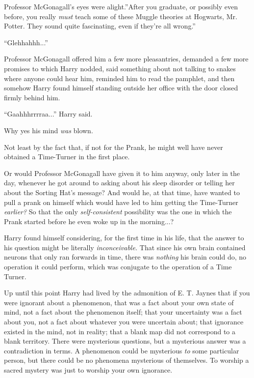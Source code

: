 Professor McGonagall's eyes were alight.''After you graduate, or
possibly even before, you really \emph{must} teach some of these Muggle
theories at Hogwarts, Mr. Potter. They sound quite fascinating, even if
they're all wrong.''

``Glehhahhh...''

Professor McGonagall offered him a few more pleasantries, demanded a few
more promises to which Harry nodded, said something about not talking to
snakes where anyone could hear him, reminded him to read the pamphlet,
and then somehow Harry found himself standing outside her office with
the door closed firmly behind him.

``Gaahhhrrrraa...'' Harry said.

Why yes his mind \emph{was} blown.

Not least by the fact that, if not for the Prank, he might well have
never obtained a Time-Turner in the first place.

Or would Professor McGonagall have given it to him anyway, only later in
the day, whenever he got around to asking about his sleep disorder or
telling her about the Sorting Hat's message? And would he, at that time,
have wanted to pull a prank on himself which would have led to him
getting the Time-Turner \emph{earlier?} So that the only
\emph{self-consistent} possibility was the one in which the Prank
started before he even woke up in the morning...?

Harry found himself considering, for the first time in his life, that
the answer to his question might be literally \emph{inconceivable.} That
since his own brain contained neurons that only ran forwards in time,
there was \emph{nothing} his brain could do, no operation it could
perform, which was conjugate to the operation of a Time Turner.

Up until this point Harry had lived by the admonition of E. T. Jaynes
that if you were ignorant about a phenomenon, that was a fact about your
own state of mind, not a fact about the phenomenon itself; that your
uncertainty was a fact about you, not a fact about whatever you were
uncertain about; that ignorance existed in the mind, not in reality;
that a blank map did not correspond to a blank territory. There were
mysterious questions, but a mysterious answer was a contradiction in
terms. A phenomenon could be mysterious \emph{to} some particular
person, but there could be no phenomena mysterious of themselves. To
worship a sacred mystery was just to worship your own ignorance.

